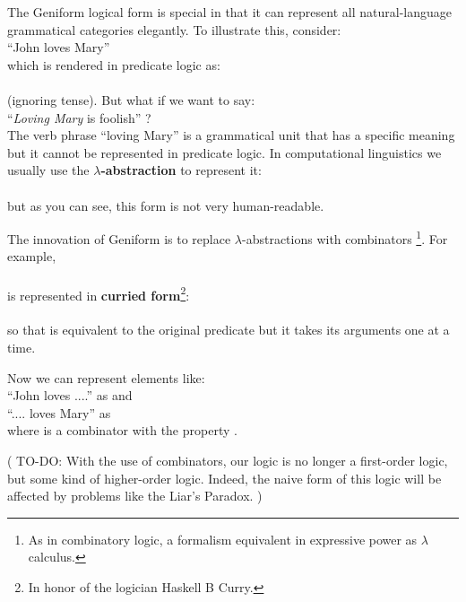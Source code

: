 The Geniform logical form is special in that it can represent all natural-language grammatical categories elegantly.  To illustrate this, consider:\\
\hspace*{1cm} ``John loves Mary''\\
which is rendered in predicate logic as:\\
\hspace*{1cm} \\
(ignoring tense).  But what if we want to say:\\
\hspace*{1cm} ``\textit{Loving Mary} is foolish'' ?\\
The verb phrase ``loving Mary'' is a grammatical unit that has a specific meaning but it cannot be represented in predicate logic.  In computational linguistics we usually use the \textbf{$\lambda$-abstraction} to represent it:\\
\hspace*{1cm} \\
but as you can see, this form is not very human-readable.

The innovation of Geniform is to replace $\lambda$-abstractions with combinators \footnote{As in combinatory logic, a formalism equivalent in expressive power as $\lambda$ calculus.}.  For example,\\
\hspace*{1cm} \\
is represented in \textbf{curried form}\footnote{In honor of the logician Haskell B Curry.}:\\
\hspace*{1cm} \\
so that  is equivalent to the original predicate but it takes its arguments one at a time.

Now we can represent elements like:\\
\hspace*{1cm} ``John loves ....'' as  and\\
\hspace*{1cm} ``.... loves Mary'' as \\
where  is a combinator with the property .

( TO-DO:  With the use of combinators, our logic is no longer a first-order logic, but some kind of higher-order logic.  Indeed, the naive form of this logic will be affected by problems like the Liar's Paradox. )

